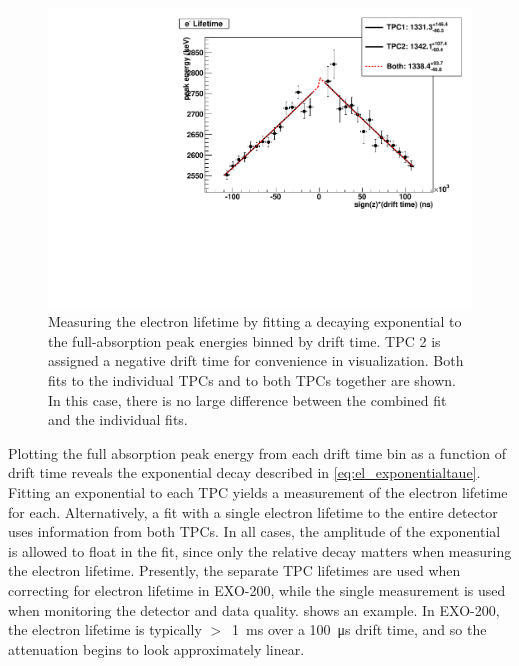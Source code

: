 \documentclass[herrin-thesis.tex]{subfiles}
\begin{document}
\begin{figure}[htbp]
\centering
\includegraphics[width=0.6\columnwidth]{./plots/el_run4228_fit.pdf}
\caption[An example fit to exponential attenuation]{Measuring the electron lifetime by fitting a decaying exponential to the full-absorption peak energies binned by drift time. TPC 2 is assigned a negative drift time for convenience in visualization. Both fits to the individual TPCs and to both TPCs together are shown. In this case, there is no large difference between the combined fit and the individual fits.}
\label{fig:el_elfit}
\end{figure}

Plotting the full absorption peak energy from each drift time bin as a function of drift time reveals the exponential decay described in \cref{eq:el_exponentialtaue}. Fitting an exponential to each TPC yields a measurement of the electron lifetime for each. Alternatively, a fit with a single electron lifetime to the entire detector uses information from both TPCs. In all cases, the amplitude of the exponential is allowed to float in the fit, since only the relative decay matters when measuring the electron lifetime. Presently, the separate TPC lifetimes are used when correcting for electron lifetime in EXO-200, while the single measurement is used when monitoring the detector and data quality.  shows an example. In EXO-200, the electron lifetime is typically \(>\)~\SI{1}{\ms} over a \SI{100}{\micro\s} drift time, and so the attenuation begins to look approximately linear.
\end{document}
